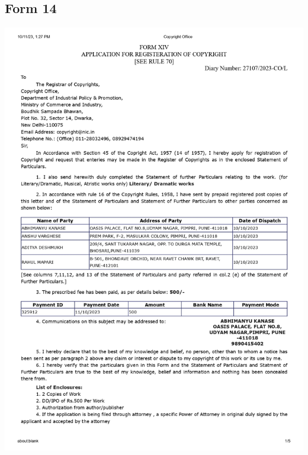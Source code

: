 \documentclass[12pt,a4paper]{report}
\begin{document}
\subsection{Form 14}
\includegraphics[scale =0.7]
{images/copyright/Form14_page-0001.jpg}
\newpage
\end{document}
